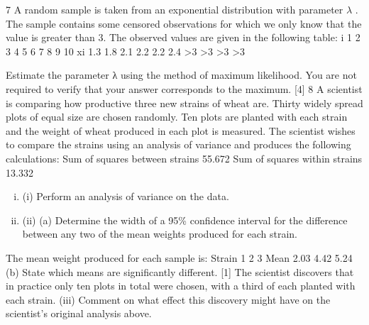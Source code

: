 \documentclass[a4paper,12pt]{article}
\begin{document}
\begin{enumerate}
7 A random sample is taken from an exponential distribution with parameter $\lambda$ . The
sample contains some censored observations for which we only know that the value is
greater than 3. The observed values are given in the following table:
  i 1 2 3 4 5 6 7 8 9 10
xi 1.3 1.8 2.1 2.2 2.2 2.4 >3 >3 >3 >3

Estimate the parameter λ using the method of maximum likelihood. You are not required to verify that your answer corresponds to the maximum. [4]
8 A scientist is comparing how productive three new strains of wheat are. Thirty widely spread plots of equal size are chosen randomly. Ten plots are planted with each strain and the weight of wheat produced in each plot is measured. The scientist
wishes to compare the strains using an analysis of variance and produces the
following calculations:
  Sum of squares between strains 55.672
Sum of squares within strains 13.332
\begin{enumerate}[(i)]
\item (i) Perform an analysis of variance on the data. 
\item (ii) (a) Determine the width of a 95\% confidence interval for the difference
between any two of the mean weights produced for each strain. 
\end{enumerate}
The mean weight produced for each sample is:
  Strain 1 2 3
Mean 2.03 4.42 5.24
(b) State which means are significantly different. [1]
The scientist discovers that in practice only ten plots in total were chosen, with a third of each planted with each strain.
(iii) Comment on what effect this discovery might have on the scientist’s original analysis above. 


\end{enumerate}
\end{document}
